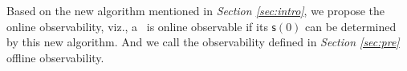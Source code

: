 

Based on the new algorithm mentioned in {\em Section \ref{sec:intro}}, we propose the online observability, viz., a \BCN\ is online observable if its $\mathsf{s}(0)$ can be determined by this new algorithm. And we call the observability defined in {\em Section \ref{sec:pre}} offline observability.




